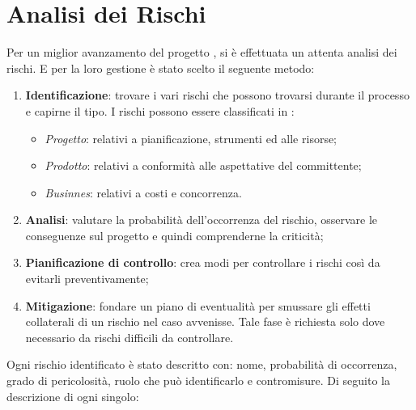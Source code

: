 \documentclass[12pt,a4paper,titlepage]{article}
\begin{document}
	\section{Analisi dei Rischi}
	Per un miglior avanzamento del progetto , si è effettuata un attenta analisi dei rischi. E per la loro gestione è stato scelto il seguente metodo: 
	\begin{enumerate}
		\item \textbf{Identificazione}: trovare i vari rischi  che possono trovarsi durante il processo e capirne il tipo. I rischi possono essere classificati in :
		\begin{itemize}
			\item \textit{Progetto}: relativi a pianificazione, strumenti ed alle risorse;
			\item \textit{Prodotto}: relativi a conformità alle aspettative del committente;
			\item \textit{Businnes}: relativi a costi e concorrenza.
		\end{itemize}
		\item \textbf{Analisi}: valutare la probabilità dell'occorrenza del rischio, osservare le conseguenze sul progetto e quindi comprenderne la criticità; 
		\item \textbf{Pianificazione di controllo}: crea modi per controllare i rischi così da evitarli preventivamente;
		\item \textbf{Mitigazione}: fondare un piano di eventualità per smussare gli effetti collaterali di un rischio nel caso avvenisse. Tale fase è richiesta solo dove necessario da rischi difficili da controllare.
	\end{enumerate}
	Ogni rischio identificato è stato descritto con: nome, probabilità di occorrenza, grado di pericolosità, ruolo che può identificarlo e contromisure. Di seguito la descrizione di ogni singolo:\\
	
\end{document}
